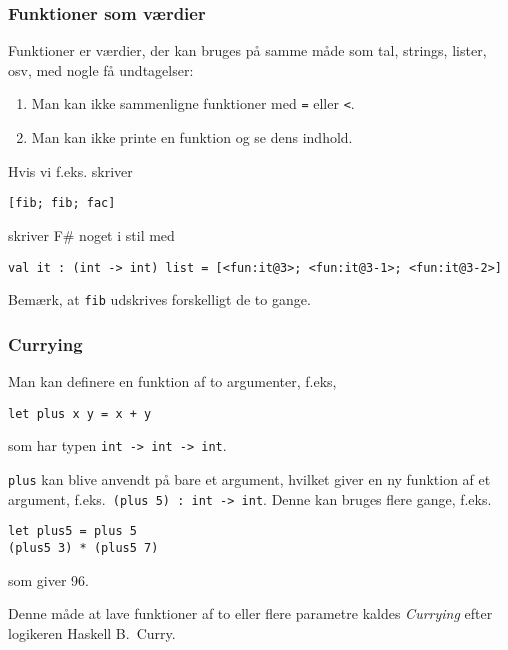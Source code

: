 \documentclass{beamer}
\begin{document}
\begin{frame}[fragile=singleslide]
\frametitle{Funktioner som værdier}

Funktioner er værdier, der kan bruges på samme måde som tal, strings,
lister, osv, med nogle få undtagelser:

\begin{enumerate}[~1.]
\item Man kan ikke sammenligne funktioner med \texttt{=} eller
  \texttt{<}.
\item Man kan ikke printe en funktion og se dens indhold.
\end{enumerate}

Hvis vi f.eks. skriver

\begin{verbatim}
[fib; fib; fac]
\end{verbatim}

skriver F\# noget i stil med

{\footnotesize
\begin{verbatim}
val it : (int -> int) list = [<fun:it@3>; <fun:it@3-1>; <fun:it@3-2>]
\end{verbatim}
}

Bemærk, at \texttt{fib} udskrives forskelligt de to gange.

\end{frame}

\begin{frame}[fragile=singleslide]
\frametitle{Currying}

Man kan definere en funktion af to argumenter, f.eks,


\begin{verbatim}
let plus x y = x + y
\end{verbatim}

som har typen \texttt{int -> int -> int}.

\texttt{plus} kan blive anvendt på bare et argument, hvilket giver en
ny funktion af et argument, f.eks.\ \texttt{(plus 5) : int -> int}.
Denne kan bruges flere gange, f.eks.


\begin{verbatim}
let plus5 = plus 5
(plus5 3) * (plus5 7)
\end{verbatim}

som giver 96.

Denne måde at lave funktioner af to eller flere parametre kaldes
\emph{Currying} efter logikeren Haskell B.\ Curry.

\end{frame}
\end{document}
